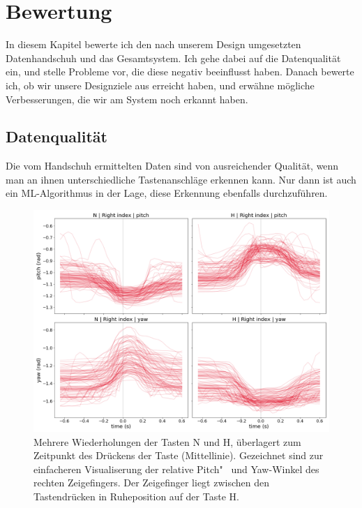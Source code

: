 \chapter{Bewertung} 

In diesem Kapitel bewerte ich den nach unserem Design umgesetzten
Datenhandschuh und das Gesamtsystem. Ich gehe dabei auf die Datenqualität ein,
und stelle Probleme vor, die diese negativ beeinflusst haben. Danach bewerte
ich, ob wir unsere Designziele aus  erreicht haben, und erwähne
mögliche Verbesserungen, die wir am System noch erkannt haben.

\section{Datenqualität} 

Die vom Handschuh ermittelten Daten sind von ausreichender Qualität, wenn man
an ihnen unterschiedliche Tastenanschläge erkennen kann. Nur dann ist auch ein
ML-Al\-go\-rith\-mus in der Lage, diese Erkennung ebenfalls durchzuführen.

\begin{figure}
    \includegraphics[width=\textwidth]{../common/images/plot-samples-2x2}
    \caption[Einzelne Samples der Tastendrücke N und H]{Mehrere Wiederholungen
    der Tasten N und H, überlagert zum Zeitpunkt des Drückens der Taste
    (Mittellinie). Gezeichnet sind zur einfacheren Visualiserung der relative
    Pitch"~ und Yaw-Winkel des rechten Zeigefingers. Der Zeigefinger liegt
    zwischen den Tastendrücken in Ruheposition auf der Taste H.}
\end{figure}

